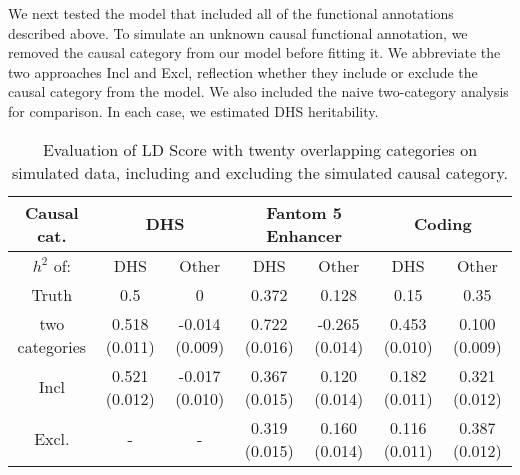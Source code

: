 \documentclass[11pt]{article}
\begin{document}
We next tested the model that included all of the functional annotations described above. To simulate an unknown causal functional annotation, we removed the causal category from our model before fitting it. We abbreviate the two approaches Incl and Excl, reflection whether they include or exclude the causal category from the model. We also included the naive two-category analysis for comparison. In each case, we estimated DHS heritability. 
\begin{table}
\begin{center}
\begin{tabular}{c|cc|cc|cc}
Causal cat. & \multicolumn{2}{c|}{DHS} & \multicolumn{2}{c|}{Fantom 5 Enhancer} & \multicolumn{2}{c}{Coding} \\
\hline
$h^2$ of: & DHS & Other & DHS & Other & DHS & Other\\
\hline
Truth & 0.5 & 0 & 0.372 & 0.128 & 0.15 & 0.35\\
two categories & 0.518 (0.011) & -0.014 (0.009) &0.722 (0.016) & -0.265 (0.014) &0.453 (0.010) & 0.100 (0.009) \\
\hline
Incl & 0.521 (0.012) & -0.017 (0.010) & 0.367 (0.015) & 0.120 (0.014) & 0.182 (0.011) & 0.321 (0.012)\\
Excl. &- & -& 0.319 (0.015) & 0.160 (0.014)& 0.116 (0.011) & 0.387 (0.012)\\
\end{tabular}
\label{2dldbinning}
\caption{Evaluation of LD Score with twenty overlapping categories on simulated data, including and excluding the simulated causal category.}
\end{center}
\end{table}
\end{document}
